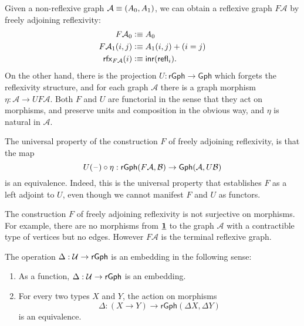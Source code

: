\begin{eg}
\begin{enumerate}
Given a non-reflexive graph $\mathcal{A}\jdeq\pairr{\pts{A},\edg{A}}$, we can obtain a reflexive graph $F\mathcal{A}$ by freely adjoining reflexivity:
\begin{align*}
\pts{F\mathcal{A}} & \defeq \pts{A} \\
\edg{F\mathcal{A}}(i,j) & \defeq \edg{A}(i,j)+(i=j) \\
\rfx{F\mathcal{A}}(i) & \defeq \inr(\refl{i}).
\end{align*}
On the other hand, there is the projection $U:\mathsf{rGph}\to\mathsf{Gph}$ which forgets the reflexivity structure, and for each graph $\mathcal{A}$ there is a graph morphism $\eta:\mathcal{A}\to UF\mathcal{A}$. Both $F$ and $U$ are functorial in the sense that they act on morphisms, and preserve units and composition in the obvious way, and $\eta$ is natural in $\mathcal{A}$. 

The universal property of the construction $F$ of freely adjoining reflexivity, is that the map
\begin{equation*}
U(\mathord{\hspace{1pt}\text{--}\hspace{1pt}})\circ \eta : \mathsf{rGph}(F\mathcal{A},\mathcal{B})\to \mathsf{Gph}(\mathcal{A},U\mathcal{B})
\end{equation*}
is an equivalence. Indeed, this is the universal property that establishes $F$ as a left adjoint to $U$, even though we cannot manifest $F$ and $U$ as functors.

The construction $F$ of freely adjoining reflexivity is not surjective on morphisms. For example, there are no morphisms from $\underline{\mathbf{1}}$ to the graph $\mathcal{A}$ with a contractible type of vertices but no edges. However $F\mathcal{A}$ is the terminal reflexive graph.
\end{enumerate}
\end{eg}

\begin{prp}\label{thm:emb_disc}
The operation $\Delta:\mathcal{U}\to\mathsf{rGph}$ is an embedding in the following sense:
\begin{enumerate}
\item As a function, $\Delta:\mathcal{U}\to\mathsf{rGph}$ is an embedding.
\item For every two types $X$ and $Y$, the action on morphisms
\begin{equation*}
\Delta : (X\to Y)\to \mathsf{rGph}(\Delta X,\Delta Y)
\end{equation*}
is an equivalence.
\end{enumerate}
\end{prp}

